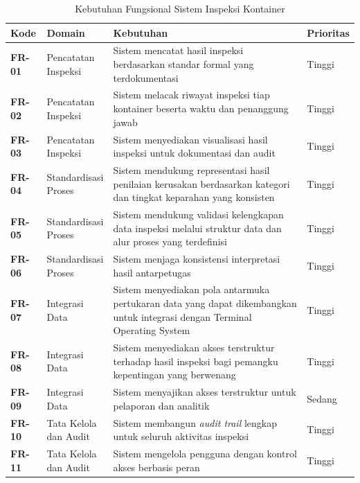 \begin{table}[ht]
\centering
\scriptsize
\caption{Kebutuhan Fungsional Sistem Inspeksi Kontainer}
\label{tbl:kebutuhan_fungsional}
\begin{tabular}{p{} p{} p{} p{}}
\toprule
\textbf{Kode} & \textbf{Domain} & \textbf{Kebutuhan} & \textbf{Prioritas} \\
\midrule
\textbf{FR-01} & \makecell[l]{Pencatatan\\Inspeksi} & Sistem mencatat hasil inspeksi berdasarkan standar formal yang terdokumentasi & Tinggi \\
\textbf{FR-02} & \makecell[l]{Pencatatan\\Inspeksi} & Sistem melacak riwayat inspeksi tiap kontainer beserta waktu dan penanggung jawab & Tinggi \\
\textbf{FR-03} & \makecell[l]{Pencatatan\\Inspeksi} & Sistem menyediakan visualisasi hasil inspeksi untuk dokumentasi dan audit & Tinggi \\
\textbf{FR-04} & \makecell[l]{Standardisasi\\Proses} & Sistem mendukung representasi hasil penilaian kerusakan berdasarkan kategori dan tingkat keparahan yang konsisten & Tinggi \\
\textbf{FR-05} & \makecell[l]{Standardisasi\\Proses} & Sistem mendukung validasi kelengkapan data inspeksi melalui struktur data dan alur proses yang terdefinisi & Tinggi \\
\textbf{FR-06} & \makecell[l]{Standardisasi\\Proses} & Sistem menjaga konsistensi interpretasi hasil antarpetugas & Tinggi \\
\textbf{FR-07} & \makecell[l]{Integrasi\\Data} & Sistem menyediakan pola antarmuka pertukaran data yang dapat dikembangkan untuk integrasi dengan Terminal Operating System & Tinggi \\
\textbf{FR-08} & \makecell[l]{Integrasi\\Data} & Sistem menyediakan akses terstruktur terhadap hasil inspeksi bagi pemangku kepentingan yang berwenang & Tinggi \\
\textbf{FR-09} & \makecell[l]{Integrasi\\Data} & Sistem menyajikan akses terstruktur untuk pelaporan dan analitik & Sedang \\
\textbf{FR-10} & \makecell[l]{Tata Kelola\\dan Audit} & Sistem membangun \textit{audit trail} lengkap untuk seluruh aktivitas inspeksi & Tinggi \\
\textbf{FR-11} & \makecell[l]{Tata Kelola\\dan Audit} & Sistem mengelola pengguna dengan kontrol akses berbasis peran & Tinggi \\
\bottomrule
\end{tabular}
\end{table}

